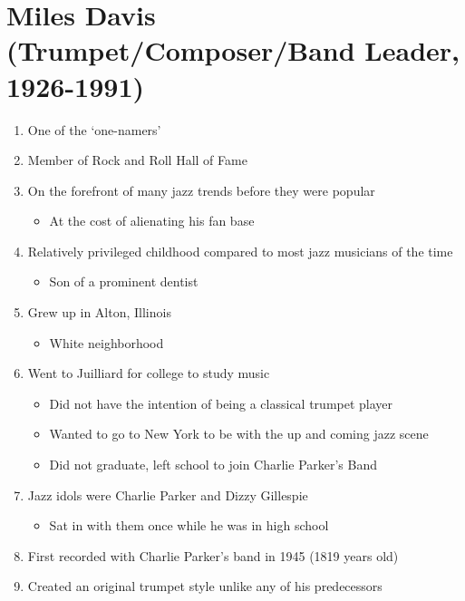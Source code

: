 \documentclass[]{article}
\providecommand{\tightlist}{%
  \setlength{\itemsep}{0pt}\setlength{\parskip}{0pt}}
\begin{document}
\section{Miles Davis (Trumpet/Composer/Band Leader,
1926-1991)}\label{miles-davis-trumpetcomposerband-leader-1926-1991}

\begin{enumerate}
\def\labelenumi{\arabic{enumi}.}
\tightlist
\item
  One of the `one-namers'
\item
  Member of Rock and Roll Hall of Fame
\item
  On the forefront of many jazz trends before they were popular

  \begin{itemize}
  \tightlist
  \item
    At the cost of alienating his fan base
  \end{itemize}
\item
  Relatively privileged childhood compared to most jazz musicians of the
  time

  \begin{itemize}
  \tightlist
  \item
    Son of a prominent dentist
  \end{itemize}
\item
  Grew up in Alton, Illinois

  \begin{itemize}
  \tightlist
  \item
    White neighborhood
  \end{itemize}
\item
  Went to Juilliard for college to study music

  \begin{itemize}
  \tightlist
  \item
    Did not have the intention of being a classical trumpet player
  \item
    Wanted to go to New York to be with the up and coming jazz scene
  \item
    Did not graduate, left school to join Charlie Parker's Band
  \end{itemize}
\item
  Jazz idols were Charlie Parker and Dizzy Gillespie

  \begin{itemize}
  \tightlist
  \item
    Sat in with them once while he was in high school
  \end{itemize}
\item
  First recorded with Charlie Parker's band in 1945 (1819 years old)
\item
  Created an original trumpet style unlike any of his predecessors


\end{enumerate}
\end{document}
